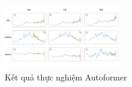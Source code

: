 \begin{figure}[H]
\centerline{\includegraphics[width=0.45\textwidth]{img/autoformer_run.jpg}}
\caption{Kết quả thực nghiệm Autoformer}
\label{fig}
\end{figure}